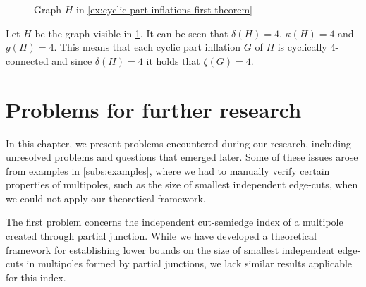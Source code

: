 \documentclass[12pt, twoside]{book}
\begin{document}
\begin{example}\label{ex:cyclic-part-inflations-first-theorem}
	\begin{figure}
		\centering
		\caption{Graph $H$ in \cref{ex:cyclic-part-inflations-first-theorem}}
		\label{fig:cyclic-part-inflations-ex-2-before}
	\end{figure}

	Let $H$ be the graph visible in \cref{fig:cyclic-part-inflations-ex-2-before}. It can be seen that $\delta(H)=4$, $\kappa(H)=4$ and $g(H)=4$. This means that each cyclic part inflation $G$ of $H$ is cyclically 4-connected and since $\delta(H)=4$ it holds that $\zeta(G)=4$.
	
\end{example}


\chapter{Problems for further research}\label{ch:problems-for-research}

In this chapter, we present problems encountered during our research, including unresolved problems and questions that emerged later. Some of these issues arose from examples in \cref{subs:examples}, where we had to manually verify certain properties of multipoles, such as the size of smallest independent edge-cuts, when we could not apply our theoretical framework.

The first problem concerns the independent cut-semiedge index of a multipole created through partial junction. While we have developed a theoretical framework for establishing lower bounds on the size of smallest independent edge-cuts in multipoles formed by partial junctions, we lack similar results applicable for this index.
\end{document}
